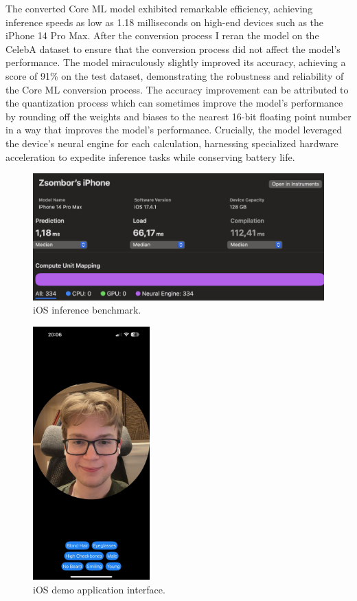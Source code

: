 \documentclass[a4paper,oneside]{article}
\begin{document}
The converted Core ML model exhibited remarkable efficiency, achieving inference speeds as low as 1.18 milliseconds on high-end devices such as the iPhone 14 Pro Max.
After the conversion process I reran the model on the CelebA dataset to ensure that the conversion process did not affect the model's performance.
The model miraculously slightly improved its accuracy, achieving a score of 91\% on the test dataset, demonstrating the robustness and reliability of the Core ML conversion process.
The accuracy improvement can be attributed to the quantization process which can sometimes improve the model's performance by rounding off the weights and biases to the nearest 16-bit floating point number in a way that improves the model's performance.
Crucially, the model leveraged the device's neural engine for each calculation, harnessing specialized hardware acceleration to expedite inference tasks while conserving battery life.

\begin{figure}[h]
  \includegraphics[width=\textwidth]{iOSInference.png}
  \centering
  \caption{iOS inference benchmark.}
  \centering
\end{figure}

\begin{figure}
  \includegraphics[width=0.4\textwidth]{iOSapp.jpeg}
  \centering
  \caption{iOS demo application interface.}
  \centering
\end{figure}
\end{document}
